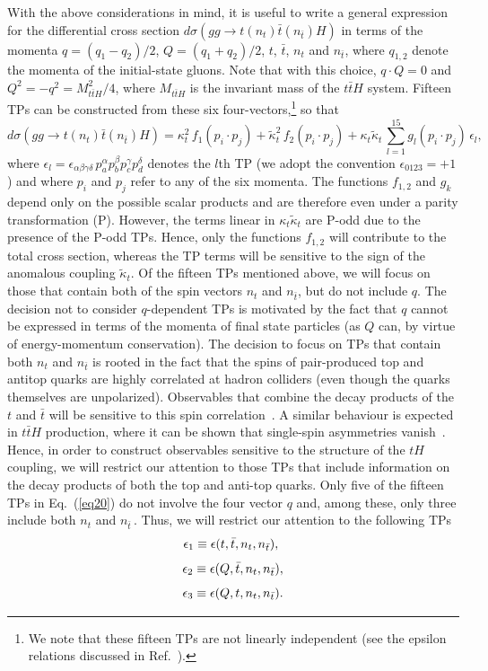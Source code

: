 \documentclass[aps,preprint,tightenlines,floatfix,superscriptaddress,nofootinbib,showpacs]{revtex4-1}
\def\beq{\begin{equation}}
\def\eeq{\end{equation}}
\def\tbar{\bar{t}}
\def\kp{\kappa_t}
\def\kpt{\tilde{\kappa}_t}
\begin{document}
With the above considerations in mind, it is useful to
write a general expression for the differential cross
section $d\sigma(gg\to t(n_t)\tbar (n_{\tbar})H)$
in terms of the momenta $q=(q_1-q_2)/2$,
$Q=(q_1+q_2)/2$, $t$, $\bar{t}$, $n_t$ and $n_{\tbar}$, where
$q_{1,2}$ denote the momenta of the initial-state gluons. Note that with this
choice, $q\cdot Q=0$ and $Q^2=-q^2=M^2_{t\tbar H}/4$, where $M_{t\tbar
  H}$ is the invariant mass of the $t\tbar H$ system.
Fifteen TPs can be constructed from these six
four-vectors,\footnote{We note that these fifteen
  TPs are not linearly independent (see the epsilon relations
  discussed in Ref.~\cite{identities}).} so that
%
\beq
\label{eq20}
d\sigma(gg\to t(n_t)\tbar (n_{\tbar})H)= \kp^2\,f_1(p_i\cdot p_j)+\tilde{\kappa}^2_t\,f_2(p_i\cdot p_j)+\kp\kpt\,\sum^{15}_{l=1}g_l(p_i\cdot p_j)\,\epsilon_l,
\eeq   
%
where
$\epsilon_l=\epsilon_{\alpha\beta\gamma\delta}\,p^{\alpha}_ap^{\beta}_bp^{\gamma}_cp^{\delta}_d$
denotes the $l$th TP (we adopt the convention $\epsilon_{0123}=+1$) and where $p_i$ and $p_j$ refer to any of the
six momenta.  The
functions $f_{1,2}$ and $g_k$ depend only on the possible scalar
products and are therefore even under a parity transformation
($\mathrm{P}$). However, the terms linear in $\kp\kpt$ are
$\mathrm{P}$-odd due to the presence of the $\mathrm{P}$-odd
TPs. Hence, only the functions $f_{1,2}$ will contribute to the total
cross section, whereas the TP terms will be sensitive to the sign of
the anomalous coupling $\kpt$. Of the fifteen TPs mentioned above,
we will focus on those that contain both of the spin
vectors $n_t$ and $n_{\tbar}$, but do not include $q$.
The decision not to consider $q$-dependent TPs is motivated by the fact
that $q$ cannot be expressed in terms of the momenta of final state
particles (as $Q$ can, by virtue of energy-momentum conservation). The
decision to focus on TPs that contain both $n_t$ and $n_{\tbar}$
is rooted in the fact that the spins of pair-produced top and antitop quarks
are highly correlated at hadron colliders 
(even though the quarks themselves are unpolarized).
Observables that combine the decay products of the
$t$ and $\tbar$ will be sensitive to this spin
correlation~\cite{Bernreuther}.  A similar behaviour is expected in $t\tbar H$
production, where it can be shown that single-spin asymmetries
vanish~\cite{Ellis,Biswas}. Hence, in order to construct observables
sensitive to the structure of the $tH$ coupling, we will restrict our attention
to those
TPs that include information on the decay products of both the top and
anti-top quarks. Only five of the fifteen TPs in Eq.~(\ref{eq20}) do
not involve the four vector $q$ and, among these, only three
include both $n_t$ and $n_{\tbar}\,$.  Thus, we will restrict our attention
to the following TPs
%
\beq
\label{eqa1}
\epsilon_1\equiv\epsilon(t,\tbar,n_t,n_{\tbar}),\,\,
\vspace*{1mm}
\eeq
%
\beq
\label{eqa2}
\epsilon_2\equiv\epsilon(Q,\tbar,n_t,n_{\tbar}),
\vspace*{1mm}
\eeq
%
\beq
\label{eqa3}
\epsilon_3\equiv\epsilon(Q,t,n_t,n_{\tbar}).
\vspace*{1mm}
\eeq
%
\par  
\end{document}
